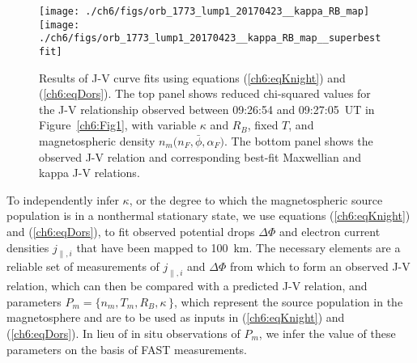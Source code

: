 
  \begin{figure}
    \centering
    \noindent\texttt{[image: ./ch6/figs/orb\_1773\_lump1\_20170423\_\_kappa\_RB\_map]}
    \noindent\texttt{[image: ./ch6/figs/orb\_1773\_lump1\_20170423\_\_kappa\_RB\_map\_\_superbestfit]}
    \caption[Orbit 1773: Reduced chi-squared values for observed J-V
    curves with variable $\kappa$ and $R_B$, fixed $T$, and
    magnetospheric density $n_m \big ( n_F, \bar{\phi}, \alpha_F \big
    )$, and corresponding best-fit J-V curves.]{Results of J-V curve
      fits using equations (\ref{ch6:eqKnight}) and
      (\ref{ch6:eqDors}). The top panel shows reduced chi-squared
      values for the J-V relationship observed between 09:26:54 and
      09:27:05~UT in Figure~\ref{ch6:Fig1}, with variable $\kappa$ and
      $R_B$, fixed $T$, and magnetospheric density $n_m \big ( n_F,
      \bar{\phi}, \alpha_F \big )$. The bottom panel shows the
      observed J-V relation and corresponding best-fit Maxwellian and
      kappa J-V relations.}
    \label{ch6:Fig3}
  \end{figure}


  To independently infer $\kappa$, or the degree to which the
  magnetospheric source population is in a nonthermal stationary
  state, we use equations (\ref{ch6:eqKnight}) and (\ref{ch6:eqDors}), to fit
  observed potential drops $\Delta \Phi$ and electron current
  densities $j_{\parallel,i}$ that have been mapped to 100~km. The
  necessary elements are a reliable set of measurements of
  $j_{\parallel,i}$ and $\Delta \Phi$ from which to form an observed
  J-V relation, which can then be compared with a predicted J-V
  relation, and parameters $P_m = \{ n_m, T_m, R_B, \kappa \, \}$,
  which represent the source population in the magnetosphere and are
  to be used as inputs in (\ref{ch6:eqKnight}) and (\ref{ch6:eqDors}). In lieu
  of in situ observations of $P_m$, we infer the value of these
  parameters on the basis of FAST measurements.



